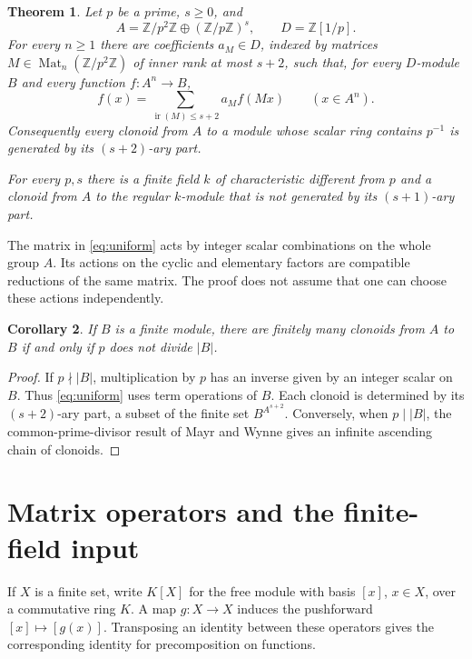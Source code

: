 \documentclass[11pt]{article}
\newtheorem{theorem}{Theorem}[section]
\newtheorem{corollary}[theorem]{Corollary}
\theoremstyle{remark}\newtheorem{remark}[theorem]{Remark}
\newcommand{\Z}{\mathbb Z}
\newcommand{\Mat}{\operatorname{Mat}}
\newcommand{\ir}{\operatorname{ir}}
\begin{document}
\begin{theorem}\label{thm:main}
Let $p$ be a prime, $s\ge0$, and
\[
 A=\Z/p^2\Z\oplus(\Z/p\Z)^s,\qquad D=\Z[1/p].
\]
For every $n\ge1$ there are coefficients $a_M\in D$, indexed by matrices $M\in\Mat_n(\Z/p^2\Z)$ of inner rank at most $s+2$, such that, for every $D$-module $B$ and every function $f:A^n\to B$,
\begin{equation}\label{eq:uniform}
 f(x)=\sum_{\ir(M)\le s+2}a_M f(Mx)\qquad(x\in A^n).
\end{equation}
Consequently every clonoid from $A$ to a module whose scalar ring contains $p^{-1}$ is generated by its $(s+2)$-ary part.

For every $p,s$ there is a finite field $k$ of characteristic different from $p$ and a clonoid from $A$ to the regular $k$-module that is not generated by its $(s+1)$-ary part.
\end{theorem}

The matrix in \eqref{eq:uniform} acts by integer scalar combinations on the whole group $A$. Its actions on the cyclic and elementary factors are compatible reductions of the same matrix. The proof does not assume that one can choose these actions independently.

\begin{corollary}\label{cor:finite}
If $B$ is a finite module, there are finitely many clonoids from $A$ to $B$ if and only if $p$ does not divide $|B|$.
\end{corollary}
\begin{proof}
If $p\nmid|B|$, multiplication by $p$ has an inverse given by an integer scalar on $B$. Thus \eqref{eq:uniform} uses term operations of $B$. Each clonoid is determined by its $(s+2)$-ary part, a subset of the finite set $B^{A^{s+2}}$. Conversely, when $p\mid|B|$, the common-prime-divisor result of Mayr and Wynne \cite[Theorem 1.3]{MW} gives an infinite ascending chain of clonoids.
\end{proof}

\section{Matrix operators and the finite-field input}

If $X$ is a finite set, write $K[X]$ for the free module with basis $[x]$, $x\in X$, over a commutative ring $K$. A map $g:X\to X$ induces the pushforward $[x]\mapsto[g(x)]$. Transposing an identity between these operators gives the corresponding identity for precomposition on functions.
\end{document}
